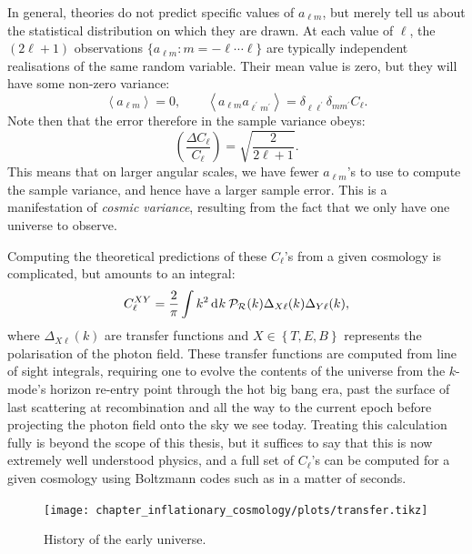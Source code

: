 In general, theories do not predict specific values of $a_{\ell m}$, but merely tell us about the statistical distribution on which they are drawn. At each value of $\ell$, the $(2\ell + 1)$ observations $\{a_{\ell m}:m=-\ell\cdots\ell\}$ are typically independent realisations of the same random variable. Their mean value is zero, but they will have some non-zero variance:
\begin{equation}
  \left\langle a_{\ell m} \right\rangle = 0, \qquad
  \left\langle a_{\ell m} a_{\ell^\prime m^\prime}\right\rangle = \delta_{\ell \ell^\prime} \delta_{m m^\prime} C_\ell.
\end{equation}
Note then that the error therefore in the sample variance obeys:
\begin{equation}
  \left( \frac{\Delta C_\ell}{C_\ell} \right) = \sqrt{\frac{2}{2\ell+1}}.
\end{equation}
This means that on larger angular scales, we have fewer $a_{\ell m}$'s to use to compute the sample variance, and hence have a larger sample error. This is a manifestation of {\em cosmic variance}, resulting from the fact that we only have one universe to observe. 

Computing the theoretical predictions of these $C_\ell$'s from a given cosmology is complicated, but amounts to an integral:
\begin{equation}
  C_\ell^{XY} = \frac{2}{\pi}\int k^2 \operatorname{d}^{}\!{k} \: \mathcal{P}_\mathcal{R}(k) \Delta_{X\ell}(k)\Delta_{Y\ell}(k),
\end{equation}
where $\Delta_{X\ell}(k)$ are transfer functions and ${X\in\left\{ T,E,B \right\}}$ represents the polarisation of the photon field. These transfer functions are computed from line of sight integrals, requiring one to evolve the contents of the universe from the $k$-mode's horizon re-entry point through the hot big bang era, past the surface of last scattering at recombination and all the way to the current epoch before projecting the photon field onto the sky we see today. Treating this calculation fully is beyond the scope of this thesis, but it suffices to say that this is now extremely well understood physics, and a full set of $C_\ell$'s can be computed for a given cosmology using Boltzmann codes such as \CAMB{} in a matter of seconds.

\begin{figure}
  \centering
  \texttt{[image: chapter\_inflationary\_cosmology/plots/transfer.tikz]}
  \caption{History of the early universe.\label{fig:cos:transfer}}
\end{figure}

